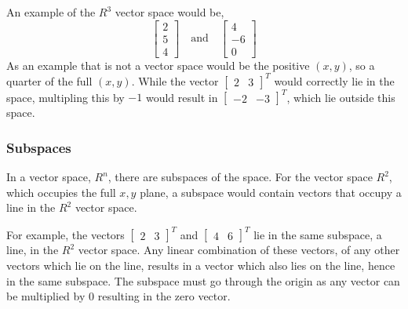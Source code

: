             \par \hfill \break
            An example of the \(R^3\) vector space would be,
            \begin{equation}
                \begin{bmatrix}
                    2 \\ 5 \\ 4
                \end{bmatrix}
                \quad \textrm{and} \quad
                \begin{bmatrix}
                    4 \\ -6 \\ 0
                \end{bmatrix}
            \end{equation}
            As an example that is not a vector space would be the positive \((x,y)\), so a quarter of the full 
            \((x,y)\). While the vector \(\begin{bmatrix} 2 & 3 \end{bmatrix}^T\) would correctly lie in the space,
            multipling this by \(-1\) would result in \(\begin{bmatrix} -2 & -3 \end{bmatrix}^T\), which lie outside
            this space.

        \subsubsection{Subspaces}
            In a vector space, \(R^n\), there are subspaces of the space. For the vector space \(R^2\), which occupies 
            the full \(x,y\) plane, a subspace would contain vectors that occupy a line in the \(R^2\) vector space.

            \par \hfill \break
            For example, the vectors \(\begin{bmatrix} 2 & 3 \end{bmatrix}^T\) and 
            \(\begin{bmatrix} 4 & 6 \end{bmatrix}^T\) lie in the same subspace, a line, in the \(R^2\) vector space. 
            Any linear combination of these vectors, of any other vectors which lie on the line, results in a vector 
            which also lies on the line, hence in the same subspace. The subspace must go through the origin as any 
            vector can be multiplied by 0 resulting in the zero vector.

